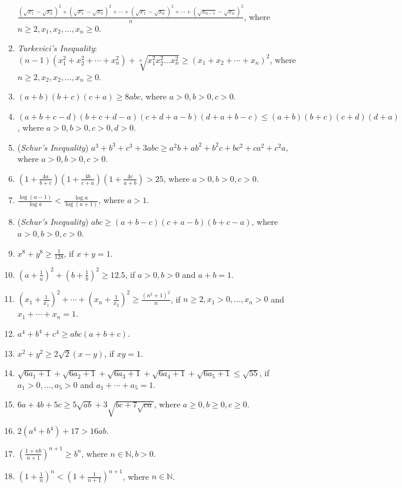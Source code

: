 \begin{enumerate}
  $\frac{(\sqrt{x_1} - \sqrt{x_2})^2 + (\sqrt{x_1} -
  \sqrt{x_3})^2 + \cdots + (\sqrt{x_1} - \sqrt{x_n})^2 + \cdots + (\sqrt{x_{n - 1}} - \sqrt{x_n})^2}{n}$, where $n\geq 2, x_1, x_2,
  \ldots, x_n\geq 0$.
\item \textit{Turkevici's Inequality}: $(n - 1)(x_1^2 + x_2^2 + \cdots + x_n^2) + \sqrt[n]{x_1^2x_2^2\ldots x_n^2}\geq (x_1 + x_2 +
  \cdots + x_n)^2$, where $n\geq 2, x_2, x_2, \ldots, x_n\geq 0$.
\item $(a + b)(b + c)(c + a)\geq 8abc$, where $a>0, b>0, c>0$.
\item $(a + b + c - d)(b + c + d - a)(c + d + a - b)(d + a + b - c)\leq (a + b)(b + c)(c + d)(d + a)$, where $a > 0, b > 0, c > 0,
  d > 0$.
\item (\textit{Schur's Inequality}) $a^3 + b^3 + c^3 + 3abc \geq a^2b + ab^2 + b^2c + bc^2 + ca^2 + c^2a$, where $a > 0, b > 0, c > 0$.
\item $\left(1 + \frac{4a}{b + c}\right)\left(1 + \frac{4b}{c + a}\right)\left(1 + \frac{4c}{a + b}\right) > 25$, where $a > 0, b >
  0, c > 0$.
\item $\frac{\log(a - 1)}{\log a} < \frac{\log a}{\log(a + 1)}$, where $a > 1$.
\item (\textit{Schur's Inequality}) $abc \geq (a + b - c)(c + a - b)(b + c - a)$, where $a>0, b>0, c>0$.
\item $x^8 + y^8 \geq \frac{1}{128}$, if $x + y = 1$.
\item $\left(a + \frac{1}{a}\right)^2 + \left(b + \frac{1}{b}\right)^2\geq 12.5$, if $a > 0, b > 0$ and $a + b = 1$.
\item $\left(x_1 + \frac{1}{x_1}\right)^2 + \cdots + \left(x_n + \frac{1}{x_2}\right)^2\geq \frac{(n^2 + 1)^2}{n}$, if $n\geq 2,
  x_1> 0, \ldots, x_n>0$ and $x_1 + \cdots + x_n = 1$.
\item $a^4 + b^4 + c^4 \geq abc(a + b + c)$.
\item $x^2 + y^2 \geq 2\sqrt{2}(x - y)$, if $xy = 1$.
\item $\sqrt{6a_1 + 1} + \sqrt{6a_2 + 1} + \sqrt{6a_3 + 1} + \sqrt{6a_4 + 1} + \sqrt{6a_5 + 1}\leq \sqrt{55}$, if $a_1 > 0, \ldots,
  a_5 > 0$ and $a_1 + \cdots + a_5 = 1$.
\item $6a + 4b + 5c\geq 5\sqrt{ab} + 3\sqrt{bc + 7\sqrt{ca}}$, where $a\geq 0, b\geq 0, c\geq 0$.
\item $2(a^4 + b^4) + 17 > 16 ab$.
\item $\left(\frac{1 + nb}{n + 1}\right)^{n + 1}\geq b^n$, where $n\in\mathbb{N}, b > 0$.
\item $\left(1 + \frac{1}{n}\right)^n < \left(1 + \frac{1}{n + 1}\right)^{n + 1}$, where $n\in\mathbb{N}$.

\end{enumerate}
